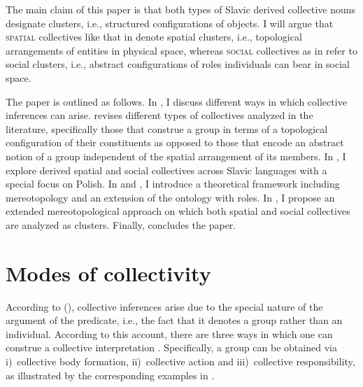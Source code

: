 \documentclass[output=paper]{langscibook}
\begin{document}
\ea \label{wan:ex:polish-collectives} \label{wan:ex:polish-kwiecie}
\label{wan:ex:polish-duchowienstwo}
\z
\z

\noindent The main claim of this paper is that both types of Slavic derived collective nouns designate clusters, i.e., structured configurations of objects. I will argue that \textsc{spatial} collectives like that in  denote spatial clusters, i.e., topological arrangements of entities in physical space, whereas \textsc{social} collectives as in  refer to social clusters, i.e., abstract configurations of roles individuals can bear in social space. 

The paper is outlined as follows. In , I discuss different ways in which collective inferences can arise.  revises different types of collectives analyzed in the literature, specifically those that construe a group in terms of a topological configuration of their constituents as opposed to those that encode an abstract notion of a group independent of the spatial arrangement of its members. In , I explore derived spatial and social collectives across Slavic languages with a special focus on Polish. In  and , I introduce a theoretical framework including mereotopology and an extension of the ontology with roles. In , I propose an extended mereotopological approach on which both spatial and social collectives are analyzed as clusters. Finally,  concludes the paper.

\section{Modes of collectivity}\label{wan:sec:modes-of-collectivity}

According to \citeauthor{landman1989groupsi} (\citeyear{landman1989groupsi,landman2000events}), collective inferences arise due to the special nature of the argument of the predicate, i.e., the fact that it denotes a group rather than an individual. According to this account, there are three ways in which one can construe a collective interpretation \citep[165--169]{landman2000events}. Specifically, a group can be obtained via i)~collective body formation, ii)~collective action and iii)~collective responsibility, as illustrated by the corresponding examples in .
\end{document}
